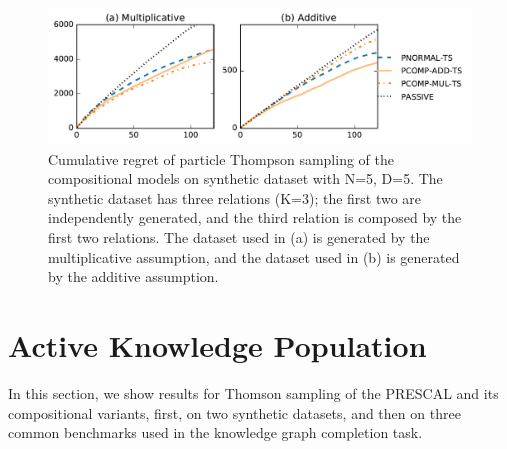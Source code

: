 \begin{figure}[t]
	\centering
	\includegraphics[width=\linewidth]{images/toy_comp_5_2_5.pdf}
	\caption{\label{fig:comp_synthetic} Cumulative regret of particle Thompson sampling of the compositional models on synthetic dataset with N=5, D=5. The synthetic dataset has three relations (K=3); the first two are independently generated, and the third relation is composed by the first two relations. The dataset used in (a) is generated by the multiplicative assumption, and the dataset used in (b) is generated by the additive assumption.}
\end{figure}



\section{Active Knowledge Population}
\label{sec:exp2}

In this section, we show results for Thomson sampling of the PRESCAL and its compositional variants, first, on two synthetic datasets, and then on three common benchmarks used in the knowledge graph completion task.


